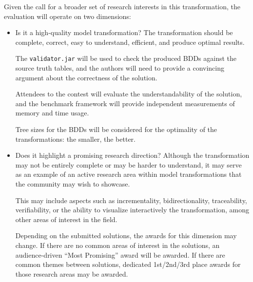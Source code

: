 \documentclass[a4paper]{scrartcl}
\newcommand*{\file}[1]{\texttt{#1}}
\begin{document}
Given the call for a broader set of research interests in this transformation,
the evaluation will operate on two dimensions:

\begin{itemize}
\item Is it a high-quality model transformation? The transformation should be
  complete, correct, easy to understand, efficient, and produce optimal results.

  The \file{validator.jar} will be used to check the produced BDDs against the
  source truth tables, and the authors will need to provide a convincing
  argument about the correctness of the solution.

  Attendees to the contest will evaluate the understandability of the solution,
  and the benchmark framework will provide independent measurements of memory
  and time usage.

  Tree sizes for the BDDs will be considered for the optimality of the
  transformations: the smaller, the better.

\item Does it highlight a promising research direction? Although the
  transformation may not be entirely complete or may be harder to understand, it
  may serve as an example of an active research area within model
  transformations that the community may wish to showcase.

  This may include aspects such as incrementality, bidirectionality,
  traceability, verifiability, or the ability to visualize interactively the
  transformation, among other areas of interest in the field.

  Depending on the submitted solutions, the awards for this dimension may
  change. If there are no common areas of interest in the solutions, an
  audience-driven ``Most Promising'' award will be awarded. If there are common
  themes between solutions, dedicated 1st/2nd/3rd place awards for those
  research areas may be awarded.
\end{itemize}
\end{document}
